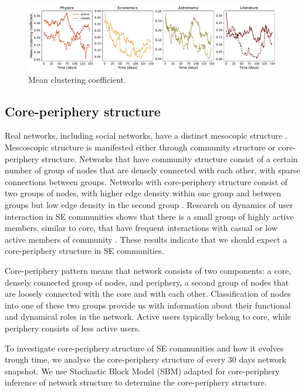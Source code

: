 \begin{figure}
	\centering
	\includegraphics[width=\linewidth]{figures/stackexchange/clustering.pdf}%
	\caption{Mean clustering coefficient.}
	\label{fig:clustering}
\end{figure}

\subsection{Core-periphery structure}

Real networks, including social networks, have a distinct mesocopic structure \cite{fortunato2010community, gallagher2020clarified}. Mescoscopic structure is manifested either through community structure or core-periphery structure. Networks that have community structure consist of a certain number of group of nodes that are densely connected with each other, with sparse connections between groups. Networks with core-periphery structure consist of two groups of nodes, with higher edge density within one group and between groups but low edge density in the second group \cite{gallagher2020clarified}. Research on dynamics of user interaction in SE communities shows that there is a small group of highly active members, similar to core,  that have frequent interactions with casual or low active members of community \cite{santos2019activity, santos2019self}. These results indicate that we should expect a core-periphery structure in SE communities. 

Core-periphery pattern means that network consists of two components: a core, densely connected group of nodes, and periphery, a second group of nodes that are loosely connected with the core and with each other. Classification of nodes into one of these two groups provide us with information about their functional and dynamical roles in the network. Active users typically belong to core, while periphery consists of less active users.

To investigate core-periphery structure of SE communities and how it evolves trough time, we analyse the core-periphery structure of every 30 days network snapshot. We use Stochastic Block Model (SBM) adapted for core-periphery inference of network structure \cite{gallagher2020clarified} to determine the core-periphery structure.  

